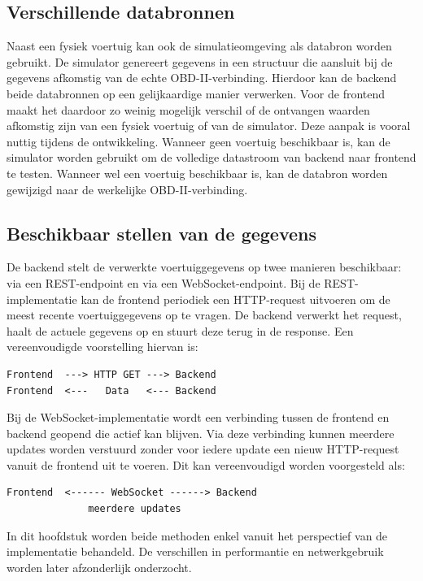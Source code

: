 \subsection{Verschillende databronnen}
Naast een fysiek voertuig kan ook de simulatieomgeving als databron worden gebruikt. De simulator genereert gegevens in een structuur die aansluit bij de gegevens afkomstig van de echte OBD-II-verbinding.
Hierdoor kan de backend beide databronnen op een gelijkaardige manier verwerken. Voor de frontend maakt het daardoor zo weinig mogelijk verschil of de ontvangen waarden afkomstig zijn van een fysiek voertuig of van de simulator.
Deze aanpak is vooral nuttig tijdens de ontwikkeling. Wanneer geen voertuig beschikbaar is, kan de simulator worden gebruikt om de volledige datastroom van backend naar frontend te testen. Wanneer wel een voertuig beschikbaar is, kan de databron worden gewijzigd naar de werkelijke OBD-II-verbinding.

\subsection{Beschikbaar stellen van de gegevens}
De backend stelt de verwerkte voertuiggegevens op twee manieren beschikbaar: via een REST-endpoint en via een WebSocket-endpoint.
Bij de REST-implementatie kan de frontend periodiek een HTTP-request uitvoeren om de meest recente voertuiggegevens op te vragen. De backend verwerkt het request, haalt de actuele gegevens op en stuurt deze terug in de response.
Een vereenvoudigde voorstelling hiervan is:

\begin{verbatim}
Frontend  ---> HTTP GET ---> Backend
Frontend  <---   Data   <--- Backend
\end{verbatim}

Bij de WebSocket-implementatie wordt een verbinding tussen de frontend en backend geopend die actief kan blijven. Via deze verbinding kunnen meerdere updates worden verstuurd zonder voor iedere update een nieuw HTTP-request vanuit de frontend uit te voeren.
Dit kan vereenvoudigd worden voorgesteld als:

\begin{verbatim}
Frontend  <------ WebSocket ------> Backend
              meerdere updates
\end{verbatim}

In dit hoofdstuk worden beide methoden enkel vanuit het perspectief van de implementatie behandeld. De verschillen in performantie en netwerkgebruik worden later afzonderlijk onderzocht.

